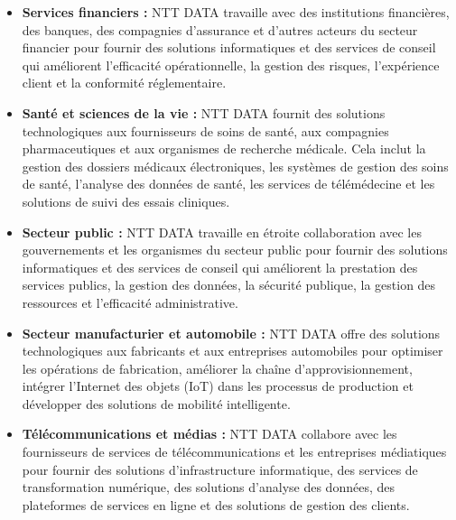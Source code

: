 \documentclass[12pt, a4paper, openany]{report}
\begin{document}
\begin{itemize}
   
    \setlength{\itemsep}{0.3cm} 
    
    
    \renewcommand{\labelitemi}{\textcolor{royalBlue}{\rule{1.2ex}{1.2ex}}} 
    
    \vspace{-0.3cm}
   
    \item \textcolor{primaryBlue}{\textbf{Services financiers :}} NTT DATA travaille avec des institutions financières, des banques, des compagnies d'assurance et d'autres acteurs du secteur financier pour fournir des solutions informatiques et des services de conseil qui améliorent l'efficacité opérationnelle, la gestion des risques, l'expérience client et la conformité réglementaire.
    
    \vspace{-0.3cm}
    \item \textcolor{primaryBlue}{\textbf{Santé et sciences de la vie :}} NTT DATA fournit des solutions technologiques aux fournisseurs de soins de santé, aux compagnies pharmaceutiques et aux organismes de recherche médicale. Cela inclut la gestion des dossiers médicaux électroniques, les systèmes de gestion des soins de santé, l'analyse des données de santé, les services de télémédecine et les solutions de suivi des essais cliniques.

    \vspace{-0.3cm}
    \item \textcolor{primaryBlue}{\textbf{Secteur public :}} NTT DATA travaille en étroite collaboration avec les gouvernements et les organismes du secteur public pour fournir des solutions informatiques et des services de conseil qui améliorent la prestation des services publics, la gestion des données, la sécurité publique, la gestion des ressources et l'efficacité administrative.

    \vspace{-0.3cm}
    \item \textcolor{primaryBlue}{\textbf{Secteur manufacturier et automobile :}} NTT DATA offre des solutions technologiques aux fabricants et aux entreprises automobiles pour optimiser les opérations de fabrication, améliorer la chaîne d'approvisionnement, intégrer l'Internet des objets (IoT) dans les processus de production et développer des solutions de mobilité intelligente.

    \vspace{-0.3cm}
    \item \textcolor{primaryBlue}{\textbf{Télécommunications et médias :}} NTT DATA collabore avec les fournisseurs de services de télécommunications et les entreprises médiatiques pour fournir des solutions d'infrastructure informatique, des services de transformation numérique, des solutions d'analyse des données, des plateformes de services en ligne et des solutions de gestion des clients.
\end{itemize}
\end{document}
